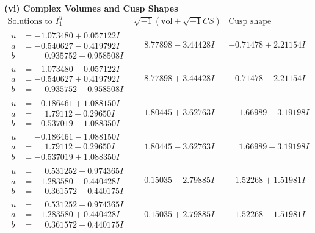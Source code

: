 \documentclass[1p]{elsarticle_modified}
\theoremstyle{definition}
\newcommand{\I}{\sqrt{-1}}
\begin{document}
\newpage\flushleft \textbf{(vi) Complex Volumes and Cusp Shapes}
$$\begin{array}{c|c|c}  
\text{Solutions to }I^u_{1}& \I (\text{vol} + \sqrt{-1}CS) & \text{Cusp shape}\\
 \hline 
\begin{aligned}
u &= -1.073480 + 0.057122 I \\
a &= -0.540627 - 0.419792 I \\
b &= \phantom{-}0.935752 - 0.958508 I\end{aligned}
 & \phantom{-}8.77898 - 3.44428 I & -0.71478 + 2.21154 I \\ \hline\begin{aligned}
u &= -1.073480 - 0.057122 I \\
a &= -0.540627 + 0.419792 I \\
b &= \phantom{-}0.935752 + 0.958508 I\end{aligned}
 & \phantom{-}8.77898 + 3.44428 I & -0.71478 - 2.21154 I \\ \hline\begin{aligned}
u &= -0.186461 + 1.088150 I \\
a &= \phantom{-}1.79112 - 0.29650 I \\
b &= -0.537019 - 1.088350 I\end{aligned}
 & \phantom{-}1.80445 + 3.62763 I & \phantom{-}1.66989 - 3.19198 I \\ \hline\begin{aligned}
u &= -0.186461 - 1.088150 I \\
a &= \phantom{-}1.79112 + 0.29650 I \\
b &= -0.537019 + 1.088350 I\end{aligned}
 & \phantom{-}1.80445 - 3.62763 I & \phantom{-}1.66989 + 3.19198 I \\ \hline\begin{aligned}
u &= \phantom{-}0.531252 + 0.974365 I \\
a &= -1.283580 - 0.440428 I \\
b &= \phantom{-}0.361572 - 0.440175 I\end{aligned}
 & \phantom{-}0.15035 - 2.79885 I & -1.52268 + 1.51981 I \\ \hline\begin{aligned}
u &= \phantom{-}0.531252 - 0.974365 I \\
a &= -1.283580 + 0.440428 I \\
b &= \phantom{-}0.361572 + 0.440175 I\end{aligned}
 & \phantom{-}0.15035 + 2.79885 I & -1.52268 - 1.51981 I \\ \hline\begin{aligned}

\end{aligned}
\end{array}$$
\end{document}
